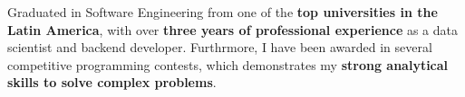 \documentclass[a4paper,12pt]{article}
\begin{document}

Graduated in Software Engineering from one of the \textbf{top universities in the Latin America},
with over \textbf{three years of professional experience} as a data scientist and backend 
developer. Furthrmore, I have been awarded in several competitive programming
contests, which demonstrates my \textbf{strong analytical skills to solve complex problems}.
\end{document}
